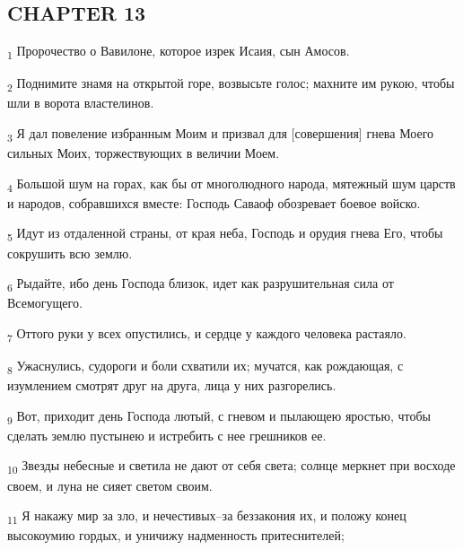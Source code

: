 \subsection{CHAPTER 13}
\begin{tcolorbox}
\textsubscript{1} Пророчество о Вавилоне, которое изрек Исаия, сын Амосов.
\end{tcolorbox}
\begin{tcolorbox}
\textsubscript{2} Поднимите знамя на открытой горе, возвысьте голос; махните им рукою, чтобы шли в ворота властелинов.
\end{tcolorbox}
\begin{tcolorbox}
\textsubscript{3} Я дал повеление избранным Моим и призвал для [совершения] гнева Моего сильных Моих, торжествующих в величии Моем.
\end{tcolorbox}
\begin{tcolorbox}
\textsubscript{4} Большой шум на горах, как бы от многолюдного народа, мятежный шум царств и народов, собравшихся вместе: Господь Саваоф обозревает боевое войско.
\end{tcolorbox}
\begin{tcolorbox}
\textsubscript{5} Идут из отдаленной страны, от края неба, Господь и орудия гнева Его, чтобы сокрушить всю землю.
\end{tcolorbox}
\begin{tcolorbox}
\textsubscript{6} Рыдайте, ибо день Господа близок, идет как разрушительная сила от Всемогущего.
\end{tcolorbox}
\begin{tcolorbox}
\textsubscript{7} Оттого руки у всех опустились, и сердце у каждого человека растаяло.
\end{tcolorbox}
\begin{tcolorbox}
\textsubscript{8} Ужаснулись, судороги и боли схватили их; мучатся, как рождающая, с изумлением смотрят друг на друга, лица у них разгорелись.
\end{tcolorbox}
\begin{tcolorbox}
\textsubscript{9} Вот, приходит день Господа лютый, с гневом и пылающею яростью, чтобы сделать землю пустынею и истребить с нее грешников ее.
\end{tcolorbox}
\begin{tcolorbox}
\textsubscript{10} Звезды небесные и светила не дают от себя света; солнце меркнет при восходе своем, и луна не сияет светом своим.
\end{tcolorbox}
\begin{tcolorbox}
\textsubscript{11} Я накажу мир за зло, и нечестивых--за беззакония их, и положу конец высокоумию гордых, и уничижу надменность притеснителей;
\end{tcolorbox}
